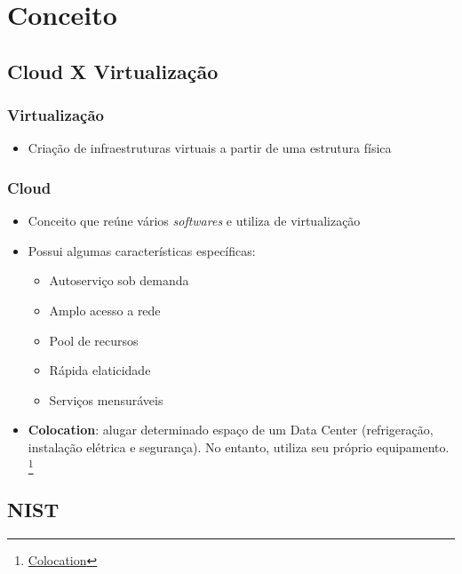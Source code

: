 \section{Conceito}

\subsection{Cloud X Virtualização}

\begin{frame}
	\frametitle{Virtualização}
	\begin{itemize}
		\item Criação de infraestruturas virtuais a partir de uma estrutura física
	\end{itemize}
\end{frame}

\begin{frame}
	\frametitle{Cloud}
	\begin{itemize}
		\item Conceito que reúne vários \textit{softwares} e utiliza de virtualização
		\item Possui algumas características específicas:
			\begin{itemize}
				\item Autoserviço sob demanda
				\item Amplo acesso a rede
				\item Pool de recursos
				\item Rápida elaticidade
				\item Serviços mensuráveis
			\end{itemize}
		\item \textbf{Colocation}: alugar determinado espaço de um Data Center (refrigeração, instalação elétrica e segurança). No entanto, utiliza seu próprio equipamento. \footnote{\href{https://vivomeunegocio.com.br/conteudos-gerais/expandir/cloud-colocation-data-center}{Colocation}}
	\end{itemize}
\end{frame}

\subsection{NIST}

